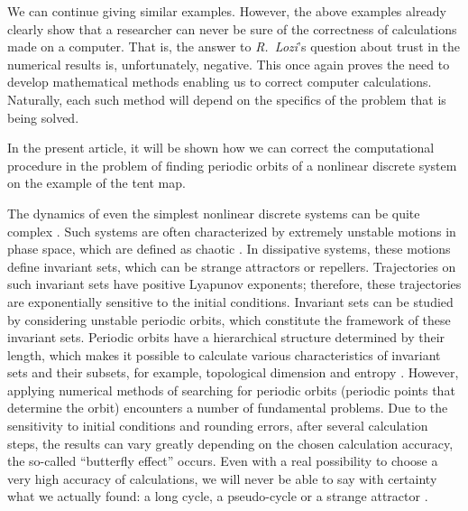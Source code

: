\documentclass[12pt,a4paper]{amsart}
\begin{document}
We can continue giving similar examples. However, the above examples already clearly show that a researcher can never be sure 
of the correctness of calculations made on a computer. That is, the answer to \textit{R.~Lozi}'s question about trust in the numerical 
results is, unfortunately, negative. This once again proves the need to develop mathematical methods enabling us to correct computer 
calculations. Naturally, each such method will depend on the specifics of the problem that is being solved.  

In the present article, it will be shown how we can correct the computational procedure in the problem of finding periodic orbits 
of a nonlinear discrete system on the example of the tent map. 

The dynamics of even the simplest nonlinear discrete systems can be quite complex \cite{Devaney, Chen, Andr}. Such systems are often characterized 
by extremely unstable motions in phase space, which are defined as chaotic \cite{Devaney}. In dissipative systems, these motions define invariant sets, 
which can be strange attractors or repellers. Trajectories on such invariant sets have positive Lyapunov exponents; therefore, these 
trajectories are exponentially sensitive to the initial conditions. Invariant sets can be studied by considering unstable periodic orbits, 
which constitute the framework of these invariant sets. Periodic orbits have a hierarchical structure determined by their length, which 
makes it possible to calculate various characteristics of invariant sets and their subsets, for example, topological dimension and entropy \cite{Biham}. 
However, applying numerical methods of searching for periodic orbits (periodic points that determine the orbit) encounters a number 
of fundamental problems. Due to the sensitivity to initial conditions and rounding errors, after several calculation steps, the results can 
vary greatly depending on the chosen calculation accuracy, the so-called ``butterfly effect'' occurs. Even with a real possibility to choose 
a very high accuracy of calculations, we will never be able to say with certainty what we actually found: a long cycle, a pseudo-cycle or 
a strange attractor \cite{Lozi}.
\end{document}
